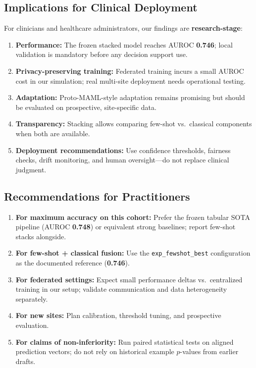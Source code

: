 \subsection{Implications for Clinical Deployment}

For clinicians and healthcare administrators, our findings are \textbf{research-stage}:

\begin{enumerate}
\item \textbf{Performance:} The frozen stacked model reaches AUROC \textbf{0.746}; local validation is mandatory before any decision support use.
\item \textbf{Privacy-preserving training:} Federated training incurs a small AUROC cost in our simulation; real multi-site deployment needs operational testing.
\item \textbf{Adaptation:} Proto-MAML-style adaptation remains promising but should be evaluated on prospective, site-specific data.
\item \textbf{Transparency:} Stacking allows comparing few-shot vs.\ classical components when both are available.
\item \textbf{Deployment recommendations:} Use confidence thresholds, fairness checks, drift monitoring, and human oversight---do not replace clinical judgment.
\end{enumerate}

\subsection{Recommendations for Practitioners}

\begin{enumerate}
\item \textbf{For maximum accuracy on this cohort:} Prefer the frozen tabular SOTA pipeline (AUROC \textbf{0.748}) or equivalent strong baselines; report few-shot stacks alongside.
\item \textbf{For few-shot + classical fusion:} Use the \texttt{exp\_fewshot\_best} configuration as the documented reference (\textbf{0.746}).
\item \textbf{For federated settings:} Expect small performance deltas vs.\ centralized training in our setup; validate communication and data heterogeneity separately.
\item \textbf{For new sites:} Plan calibration, threshold tuning, and prospective evaluation.
\item \textbf{For claims of non-inferiority:} Run paired statistical tests on aligned prediction vectors; do not rely on historical example $p$-values from earlier drafts.
\end{enumerate}


